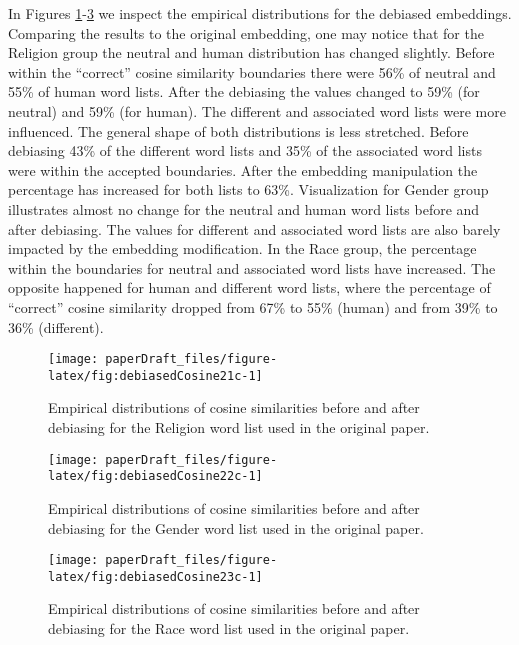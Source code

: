\documentclass[
  12pt,
  dvipsnames,enabledeprecatedfontcommands]{scrartcl}
\begin{document}
In Figures \ref{fig:empiricalDebiased}-\ref{fig:empiricalDebiased3} we
inspect the empirical distributions for the debiased embeddings.
Comparing the results to the original embedding, one may notice that for
the Religion group the neutral and human distribution has changed
slightly. Before within the ``correct'' cosine similarity boundaries
there were 56\% of neutral and 55\% of human word lists. After the
debiasing the values changed to 59\% (for neutral) and 59\% (for human).
The different and associated word lists were more influenced. The
general shape of both distributions is less stretched. Before debiasing
43\% of the different word lists and 35\% of the associated word lists
were within the accepted boundaries. After the embedding manipulation
the percentage has increased for both lists to 63\%. Visualization for
Gender group illustrates almost no change for the neutral and human word
lists before and after debiasing. The values for different and
associated word lists are also barely impacted by the embedding
modification. In the Race group, the percentage within the boundaries
for neutral and associated word lists have increased. The opposite
happened for human and different word lists, where the percentage of
``correct'' cosine similarity dropped from 67\% to 55\% (human) and from
39\% to 36\% (different).

\begin{figure}[H]

\begin{center}\texttt{[image: paperDraft\_files/figure-latex/fig:debiasedCosine21c-1]} \end{center}
\caption{Empirical distributions of cosine similarities before and after  debiasing  for  the Religion word list  used in  the original paper.}
\label{fig:empiricalDebiased}
\end{figure}

\begin{figure}[H]

\begin{center}\texttt{[image: paperDraft\_files/figure-latex/fig:debiasedCosine22c-1]} \end{center}
\caption{Empirical distributions of cosine similarities before and after  debiasing for  the Gender word list used in  the original paper.}
\label{fig:empiricalDebiased2}
\end{figure}

\begin{figure}[H]

\begin{center}\texttt{[image: paperDraft\_files/figure-latex/fig:debiasedCosine23c-1]} \end{center}
\caption{Empirical distributions of cosine similarities before and after  debiasing for the Race word list used in  the original paper.}
\label{fig:empiricalDebiased3}
\end{figure}
\end{document}
